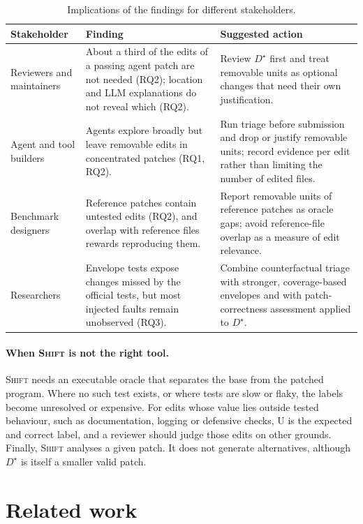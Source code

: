 \documentclass[a4paper,fleqn]{cas-sc}
\newcommand{\tool}{\textsc{Shift}}
\newcommand{\lab}[1]{\textsf{#1}}
\begin{document}
\begin{table}[pos=htbp]
\caption{Implications of the findings for different stakeholders.}
\label{tab:implications}
\centering\footnotesize
\begin{tabular}{p{30mm}p{64mm}p{64mm}}
\toprule
Stakeholder & Finding & Suggested action \\
\midrule
Reviewers and maintainers & About a third of the edits of a passing agent patch are not needed (RQ2); location and LLM explanations do not reveal which (RQ2). & Review $D^\star$ first and treat removable units as optional changes that need their own justification. \\
Agent and tool builders & Agents explore broadly but leave removable edits in concentrated patches (RQ1, RQ2). & Run triage before submission and drop or justify removable units; record evidence per edit rather than limiting the number of edited files. \\
Benchmark designers & Reference patches contain untested edits (RQ2), and overlap with reference files rewards reproducing them. & Report removable units of reference patches as oracle gaps; avoid reference-file overlap as a measure of edit relevance. \\
Researchers & Envelope tests expose changes missed by the official tests, but most injected faults remain unobserved (RQ3). & Combine counterfactual triage with stronger, coverage-based envelopes and with patch-correctness assessment applied to $D^\star$. \\
\bottomrule
\end{tabular}
\end{table}

\paragraph{When \tool{} is not the right tool.} \tool{} needs an executable oracle that separates the base from the patched program. Where no such test exists, or where tests are slow or flaky, the labels become unresolved or expensive. For edits whose value lies outside tested behaviour, such as documentation, logging or defensive checks, \lab{U} is the expected and correct label, and a reviewer should judge those edits on other grounds. Finally, \tool{} analyses a given patch. It does not generate alternatives, although $D^\star$ is itself a smaller valid patch.

\section{Related work}\label{sec:related}
\end{document}
